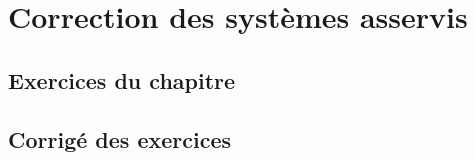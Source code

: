 \chapter{Correction des systèmes asservis\label{chap-correc}}


\newpage
\section*{Exercices du chapitre}


\exercice{}
\question

\newpage
\section*{Corrigé des exercices}


